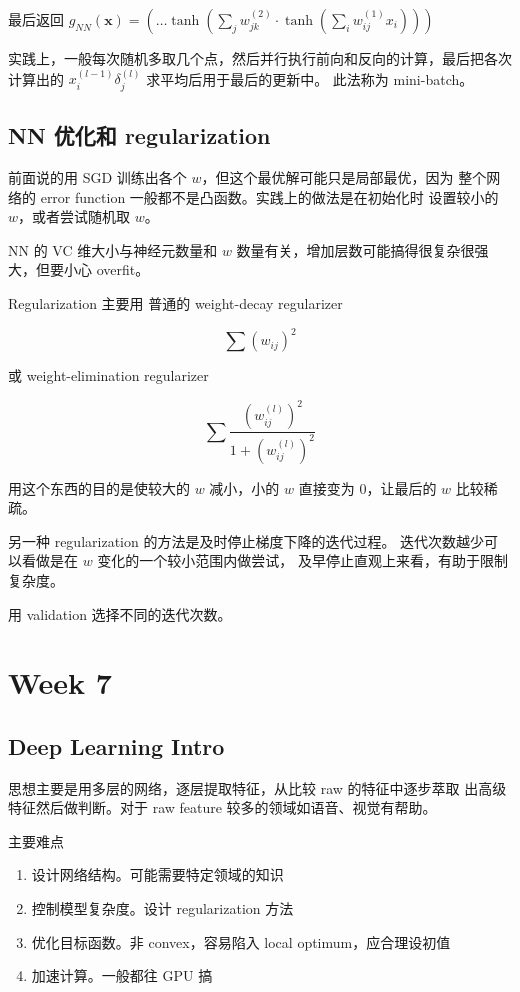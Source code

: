\documentclass[a4paper]{article}
\begin{document}
最后返回 $\displaystyle g_{NN}(\mathbf{x}) = \left ( \dots \tanh \left ( \sum_{j}w_{jk}^{(2)} \cdot \tanh \left ( \sum_{i} w_{ij}^{(1)} x_i \right ) \right ) \right )$

实践上，一般每次随机多取几个点，然后并行执行前向和反向的计算，最后把各次计算出的 $x_i^{(l-1)} \delta_j^{(l)}$ 求平均后用于最后的更新中。
此法称为 mini-batch。

\subsection{NN 优化和 regularization}
前面说的用 SGD 训练出各个 $w$，但这个最优解可能只是局部最优，因为
整个网络的 error function 一般都不是凸函数。实践上的做法是在初始化时
设置较小的 $w$，或者尝试随机取 $w$。

NN 的 VC 维大小与神经元数量和 $w$ 数量有关，增加层数可能搞得很复杂很强大，但要小心 overfit。

Regularization 主要用 普通的 weight-decay regularizer

$$\sum(w_{ij})^2$$

或 weight-elimination regularizer

$$\sum\frac{(w_{ij}^{(l)})^2}{1 + (w_{ij}^{(l)})^2}$$

用这个东西的目的是使较大的 $w$ 减小，小的 $w$ 直接变为 0，让最后的 $w$ 比较稀疏。

另一种 regularization 的方法是及时停止梯度下降的迭代过程。
迭代次数越少可以看做是在 $w$ 变化的一个较小范围内做尝试，
及早停止直观上来看，有助于限制复杂度。

用 validation 选择不同的迭代次数。




\section{Week 7}
\subsection{Deep Learning Intro}
思想主要是用多层的网络，逐层提取特征，从比较 raw 的特征中逐步萃取
出高级特征然后做判断。对于 raw feature 较多的领域如语音、视觉有帮助。

主要难点
\begin{enumerate}
  \item 设计网络结构。可能需要特定领域的知识\\
  \item 控制模型复杂度。设计 regularization 方法\\
  \item 优化目标函数。非 convex，容易陷入 local optimum，应合理设初值\\
  \item 加速计算。一般都往 GPU 搞\\
\end{enumerate}
\end{document}
